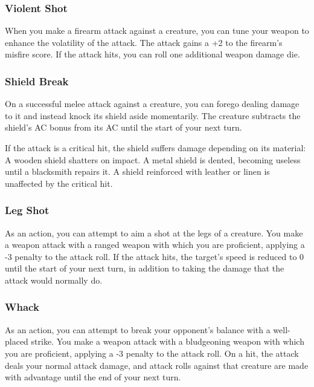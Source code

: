 \subsubsection{Violent Shot} \label{tec::violentshot}
When you make a firearm attack against a creature, you can tune your weapon to enhance the volatility of the attack.
The attack gains a +2 to the firearm's misfire score.
If the attack hits, you can roll one additional weapon damage die.

\subsubsection{Shield Break} \label{tec::shieldbreak}
On a successful melee attack against a creature, you can forego dealing damage to it and instead knock its shield aside momentarily.
The creature subtracts the shield's AC bonus from its AC until the start of your next turn.

If the attack is a critical hit, the shield suffers damage depending on its material:
A wooden shield shatters on impact.
A metal shield is dented, becoming useless until a blacksmith repairs it.
A shield reinforced with leather or linen is unaffected by the critical hit.

\subsubsection{Leg Shot} \label{tec::legshot}
As an action, you can attempt to aim a shot at the legs of a creature.
You make a weapon attack with a ranged weapon with which you are proficient, applying a -3 penalty to the attack roll.
If the attack hits, the target's speed is reduced to 0 until the start of your next turn, in addition to taking the damage that the attack would normally do.

\subsubsection{Whack} \label{tec::whack}
As an action, you can attempt to break your opponent's balance with a well-placed strike.
You make a weapon attack with a bludgeoning weapon with which you are proficient, applying a -3 penalty to the attack roll.
On a hit, the attack deals your normal attack damage, and attack rolls against that creature are made with advantage until the end of your next turn.

